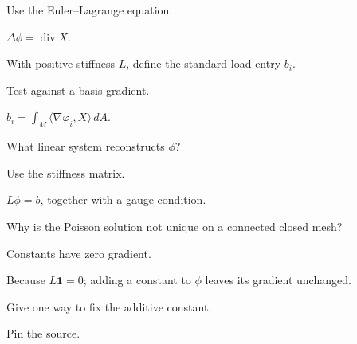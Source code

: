 \begin{hint}
Use the Euler--Lagrange equation.
\end{hint}

\begin{solution}
\(\Delta\phi=\operatorname{div}X\).
\end{solution}

\begin{exercise}\label{exr:vii40-11}
With positive stiffness \(L\), define the standard load entry \(b_i\).
\end{exercise}

\begin{hint}
Test against a basis gradient.
\end{hint}

\begin{solution}
\(b_i=\int_M\langle\nabla\varphi_i,X\rangle\,dA\).
\end{solution}

\begin{exercise}\label{exr:vii40-12}
What linear system reconstructs \(\phi\)?
\end{exercise}

\begin{hint}
Use the stiffness matrix.
\end{hint}

\begin{solution}
\(L\phi=b\), together with a gauge condition.
\end{solution}

\begin{exercise}\label{exr:vii40-13}
Why is the Poisson solution not unique on a connected closed mesh?
\end{exercise}

\begin{hint}
Constants have zero gradient.
\end{hint}

\begin{solution}
Because \(L\mathbf1=0\); adding a constant to \(\phi\) leaves its gradient unchanged.
\end{solution}

\begin{exercise}\label{exr:vii40-14}
Give one way to fix the additive constant.
\end{exercise}

\begin{hint}
Pin the source.
\end{hint}

